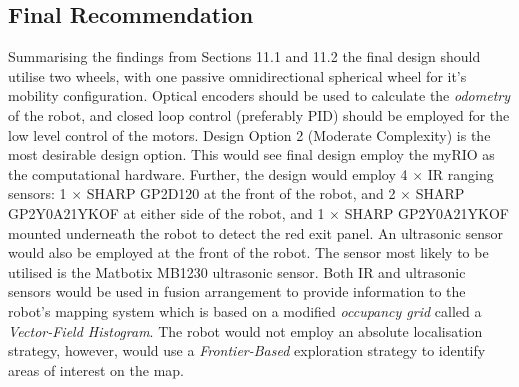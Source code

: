 \documentclass[a4paper]{article}
\begin{document}
\subsection{Final Recommendation} \normalsize
Summarising the findings from Sections 11.1 and 11.2 the final design should utilise two wheels, with one passive omnidirectional spherical wheel for it's mobility configuration. Optical encoders should be used to calculate the \textit{odometry} of the robot, and closed loop control (preferably PID) should be employed for the low level control of the motors. Design Option 2 (Moderate Complexity) is the most desirable design option. This would see final design employ the myRIO as the computational hardware. Further, the design would employ 4 $\times$ IR ranging sensors: 1 $\times$ SHARP GP2D120 at the front of the robot, and 2 $\times$ SHARP GP2Y0A21YKOF at either side of the robot, and 1 $\times$ SHARP GP2Y0A21YKOF mounted underneath the robot to detect the red exit panel. An ultrasonic sensor would also be employed at the front of the robot. The sensor most likely to be utilised is the Matbotix MB1230 ultrasonic sensor. Both IR and ultrasonic sensors would be used in fusion arrangement to provide information to the robot's mapping system which is based on a modified \textit{occupancy grid} called a \textit{Vector-Field Histogram}. The robot would not employ an absolute localisation strategy, however, would use a \textit{Frontier-Based} exploration strategy to identify areas of interest on the map.
\vspace{1cm}
\end{document}
